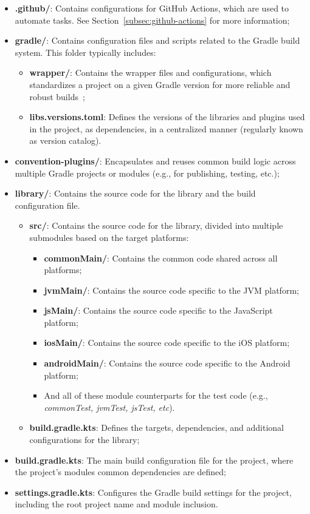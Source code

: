 \begin{itemize}
    \item \textbf{.github/}: Contains configurations for GitHub Actions, which are used to automate tasks. See Section~\ref{subsec:github-actions} for more information;
    \item \textbf{gradle/}: Contains configuration files and scripts related to the Gradle build system.
    This folder typically includes:
    \begin{itemize}
        \item \textbf{wrapper/}: Contains the wrapper files and configurations, which standardizes a project on a given Gradle version for more reliable and robust builds~\cite{gradle-wrapper};
        \item \textbf{libs.versions.toml}: Defines the versions of the libraries and plugins used in the project, as dependencies, in a centralized manner (regularly known as version catalog).
    \end{itemize}
    \item \textbf{convention-plugins/}: Encapsulates and reuses common build logic across multiple Gradle projects or modules (e.g., for publishing, testing, etc.);
    \item \textbf{library/}: Contains the source code for the library and the build configuration file.
    \begin{itemize}
        \item \textbf{src/}: Contains the source code for the library, divided into multiple submodules based on the target platforms:
        \begin{itemize}
            \item \textbf{commonMain/}: Contains the common code shared across all platforms;
            \item \textbf{jvmMain/}: Contains the source code specific to the JVM platform;
            \item \textbf{jsMain/}: Contains the source code specific to the JavaScript platform;
            \item \textbf{iosMain/}: Contains the source code specific to the iOS platform;
            \item \textbf{androidMain/}: Contains the source code specific to the Android platform;
            \item And all of these module counterparts for the test code (e.g., \textit{commonTest, jvmTest, jsTest, etc}).
        \end{itemize}
        \item \textbf{build.gradle.kts}: Defines the targets, dependencies, and additional configurations for the library;
    \end{itemize}
    \item \textbf{build.gradle.kts}: The main build configuration file for the project, where the project's modules common dependencies are defined;
    \item \textbf{settings.gradle.kts}: Configures the Gradle build settings for the project, including the root project name and module inclusion.
\end{itemize}

